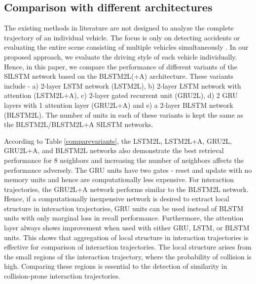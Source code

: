 \documentclass[final,journal]{IEEEtran}
\begin{document}
\subsection{Comparison with different architectures}
The existing methods in literature are not designed to analyze the complete trajectory of an individual vehicle. The focus is only on detecting accidents  \cite{accident_anomaly1,accident_anomaly2,accident_anomaly3,tracking_accident} or evaluating the entire scene consisting of multiple vehicles simultaneously \cite{anticipating1}. In our proposed approach, we evaluate the driving style of each vehicle individually. Hence, in this paper, we compare the performance of different variants of the SILSTM network based on the BLSTM2L(+A) architecture. These variants include - a) 2-layer LSTM network (LSTM2L), b) 2-layer LSTM network with attention (LSTM2L+A), c) 2-layer gated recurrent unit (GRU2L), d) 2 GRU layers with 1 attention layer (GRU2L+A) and e) a 2-layer BLSTM network (BLSTM2L). The number of units in each of these variants is kept the same as the BLSTM2L/BLSTM2L+A SILSTM networks. 

According to Table \ref{comparevariants}, the LSTM2L, LSTM2L+A, GRU2L, GRU2L+A, and BLSTM2L networks also demonstrate the best retrieval performance for 8 neighbors and increasing the number of neighbors affects the performance adversely. The GRU units have two gates - reset and update with no memory units and hence are computationally less expensive. For interaction trajectories, the GRU2L+A network performs similar to the BLSTM2L network. Hence, if a computationally inexpensive network is desired to extract local structure in interaction trajectories, GRU units can be used instead of BLSTM units with only marginal loss in recall performance. Furthermore, the attention layer always shows improvement when used with either GRU, LSTM, or BLSTM units. This shows that aggregation of local structure in interaction trajectories is effective for comparison of interaction trajectories. The local structure arises from the small regions of the interaction trajectory, where the probability of collision is high. Comparing these regions is essential to the detection of similarity in collision-prone interaction trajectories.  
\end{document}
